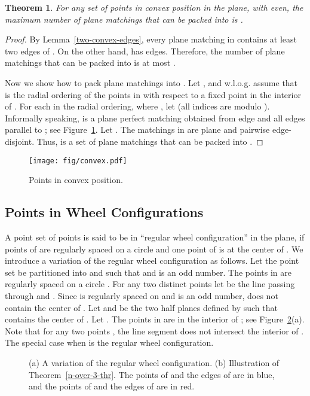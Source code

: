 \documentclass[11pt,a4paper]{article}
\newcommand{\CH}[1]{\text{}}
\newtheorem{theorem}{Theorem}
\begin{document}
\begin{theorem}
\label{convex}
For any set  of  points in convex position in the plane, with  even, the maximum number of plane matchings that can be packed into  is .
\end{theorem}
\begin{proof}
By Lemma~\ref{two-convex-edges}, every plane matching in  contains at least two edges of \CH{P}. On the other hand, \CH{P} has  edges. Therefore, the number of plane matchings that can be packed into  is at most .

Now we show how to pack  plane matchings into .
Let , and w.l.o.g. assume that  is the radial ordering of the points in  with respect to a fixed point in the interior of \CH{P}. For each  in the radial ordering, where , let  (all indices are modulo ). Informally speaking,  is a plane perfect matching obtained from edge  and all edges parallel to ; see Figure~\ref{convex-fig}. Let . The matchings in  are plane and pairwise edge-disjoint. Thus,  is a set of  plane matchings that can be packed into .  
\end{proof}

\begin{figure}[htb]
  \centering
\setlength{\tabcolsep}{0in}
\texttt{[image: fig/convex.pdf]}
  \caption{Points in convex position.}
\label{convex-fig}
\end{figure}

\subsection{Points in Wheel Configurations}
\label{wheel-section}
A point set  of  points is said to be in ``regular wheel configuration'' in the plane, if  points of  are regularly spaced on a circle  and one point of  is at the center of .
We introduce a variation of the regular wheel configuration as follows. 
Let the point set  be partitioned into  and  such that  and  is an odd number. The points in  are regularly spaced on a circle . For any two distinct points  let  be the line passing through  and . Since  is regularly spaced on  and  is an odd number,  does not contain the center of . Let  and  be the two half planes defined by  such that  contains the center of . Let . The points in  are in the interior of ; see Figure~\ref{n-over-3-fig}(a). Note that for any two points , the line segment  does not intersect the interior of . The special case when  is the regular wheel configuration.

\begin{figure}[htb]
  \centering
\setlength{\tabcolsep}{0in}
  
  \caption{(a) A variation of the regular wheel configuration. (b) Illustration of Theorem~\ref{n-over-3-thr}. The points of  and the edges of  are in blue, and the points of  and the edges of  are in red.}
\label{n-over-3-fig}
\end{figure}
\end{document}

